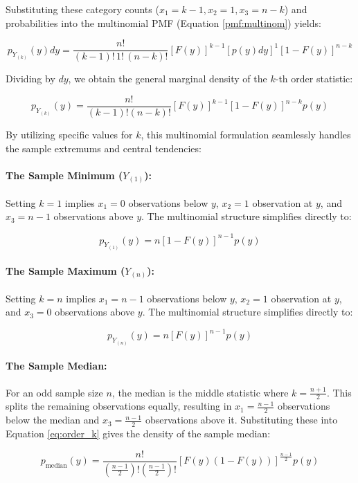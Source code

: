 Substituting these category counts ($x_1 = k-1, x_2 = 1, x_3 = n-k$) and probabilities into the multinomial PMF (Equation \ref{pmf:multinom}) yields:

	\[
	p_{Y_{(k)}}(y)dy = \frac{n!}{(k-1)! \, 1! \, (n-k)!} \left[F(y)\right]^{k-1} \left[p(y)dy\right]^1 \left[1 - F(y)\right]^{n-k}
	\]
	
Dividing by $dy$, we obtain the general marginal density of the $k$-th order statistic:

\begin{equation}
	p_{Y_{(k)}}(y) = \frac{n!}{(k-1)!(n-k)!} \left[F(y)\right]^{k-1} \left[1 - F(y)\right]^{n-k} p(y)
	\label{eq:order_k}
\end{equation}

By utilizing specific values for $k$, this multinomial formulation seamlessly handles the sample extremums and central tendencies:

\paragraph{The Sample Minimum ($Y_{(1)}$):}
Setting $k = 1$ implies $x_1 = 0$ observations below $y$, $x_2 = 1$ observation at $y$, and $x_3 = n-1$ observations above $y$. The multinomial structure simplifies directly to:

	\[
	p_{Y_{(1)}}(y) = n \left[1 - F(y)\right]^{n-1} p(y)
	\]

\paragraph{The Sample Maximum ($Y_{(n)}$):}
Setting $k = n$ implies $x_1 = n-1$ observations below $y$, $x_2 = 1$ observation at $y$, and $x_3 = 0$ observations above $y$. The multinomial structure simplifies directly to:

	\[
	p_{Y_{(n)}}(y) = n \left[F(y)\right]^{n-1} p(y)
	\]

\paragraph{The Sample Median:}
For an odd sample size $n$, the median is the middle statistic where $k = \frac{n+1}{2}$. This splits the remaining observations equally, resulting in $x_1 = \frac{n-1}{2}$ observations below the median and $x_3 = \frac{n-1}{2}$ observations above it. Substituting these into Equation \ref{eq:order_k} gives the density of the sample median:

	\[
	p_{\text{median}}(y) = \frac{n!}{\left(\frac{n-1}{2}\right)!\left(\frac{n-1}{2}\right)!} \left[F(y)(1 - F(y))\right]^{\frac{n-1}{2}} p(y)
	\]
	

